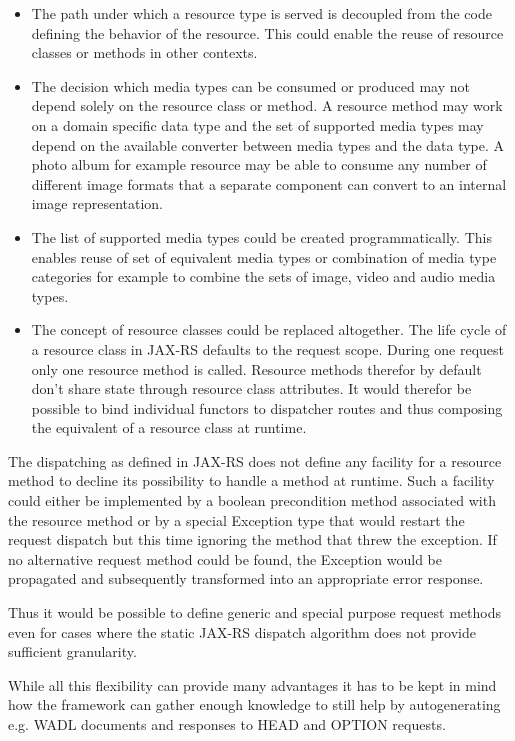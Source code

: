 \documentclass[12pt,a4paper,twoside]{scrartcl}		%
\begin{document}
\begin{itemize}
\item The path under which a resource type is served is decoupled from the code
  defining the behavior of the resource. This could enable the reuse of resource
  classes or methods in other contexts.
\item The decision which media types can be consumed or produced may not depend
  solely on the resource class or method. A resource method may work on a domain
  specific data type and the set of supported media types may depend on the
  available converter between media types and the data type. A photo album for example
  resource may be able to consume any number of different image formats that
  a separate component can convert to an internal image representation.
\item The list of supported media types could be created programmatically. This
  enables reuse of set of equivalent media types or combination of media type
  categories for example to combine the sets of image, video and audio media
  types.
\item The concept of resource classes could be replaced altogether. The life
  cycle of a resource class in JAX-RS defaults to the request scope. During one
  request only one resource method is called. Resource methods therefor by
  default don't share state through resource class attributes. It would therefor
  be possible to bind individual functors to dispatcher routes and thus
  composing the equivalent of a resource class at runtime.
\end{itemize}


The dispatching as defined in JAX-RS does not define any facility for a resource
method to decline its possibility to handle a method at runtime. Such a facility
could either be implemented by a boolean precondition method associated with the
resource method or by a special Exception type that would restart the request
dispatch but this time ignoring the method that threw the exception. If no
alternative request method could be found, the Exception would be propagated and
subsequently transformed into an appropriate error response.

Thus it would be possible to define generic and special purpose request methods
even for cases where the static JAX-RS dispatch algorithm does not provide
sufficient granularity.

While all this flexibility can provide many advantages it has to be kept in mind
how the framework can gather enough knowledge to still help by autogenerating
e.g. WADL documents and responses to HEAD and OPTION requests.
\end{document}
